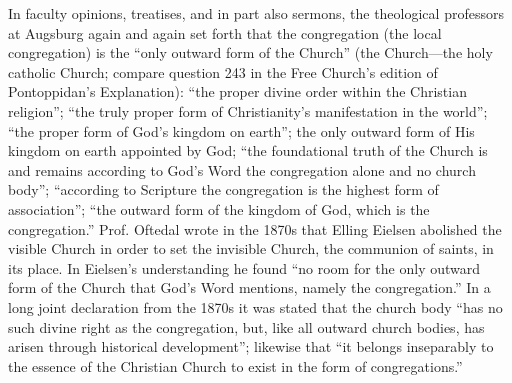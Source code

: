 

In faculty opinions, treatises, and in part also sermons, the theological professors at Augsburg again and again set forth that the congregation (the local congregation) is the “only outward form of the Church” (the Church—the holy catholic Church; compare question 243 in the Free Church’s edition of Pontoppidan’s Explanation): “the proper divine order within the Christian religion”; “the truly proper form of Christianity’s manifestation in the world”; “the proper form of God’s kingdom on earth”; the only outward form of His kingdom on earth appointed by God; “the foundational truth of the Church is and remains according to God’s Word the congregation alone and no church body”; “according to Scripture the congregation is the highest form of association”; “the outward form of the kingdom of God, which is the congregation.” Prof. Oftedal wrote in the 1870s that Elling Eielsen abolished the visible Church in order to set the invisible Church, the communion of saints, in its place. In Eielsen’s understanding he found “no room for the only outward form of the Church that God’s Word mentions, namely the congregation.” In a long joint declaration from the 1870s it was stated that the church body “has no such divine right as the congregation, but, like all outward church bodies, has arisen through historical development”; likewise that “it belongs inseparably to the essence of the Christian Church to exist in the form of congregations.”

